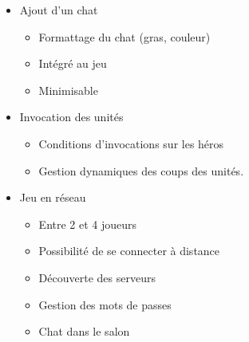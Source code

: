 \begin{itemize}
\begin{itemize}
    \end{itemize}
    \item Ajout d'un chat
    \begin{itemize}
        \item Formattage du chat (gras, couleur)
        \item Intégré au jeu
        \item Minimisable
    \end{itemize}
    \item Invocation des unités
    \begin{itemize}
        \item Conditions d'invocations sur les héros
        \item Gestion dynamiques des coups des unités.
    \end{itemize}
    \item Jeu en réseau
    \begin{itemize}
        \item Entre 2 et 4 joueurs
        \item Possibilité de se connecter à distance
        \item Découverte des serveurs
        \item Gestion des mots de passes
        \item Chat dans le salon
    \end{itemize}
\end{itemize}

